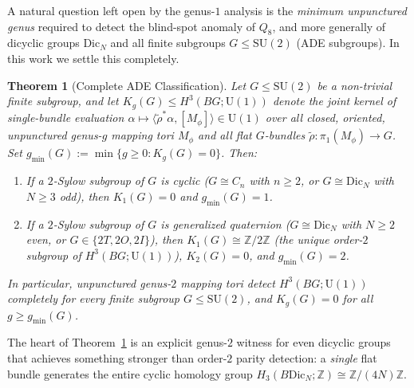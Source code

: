 \documentclass[11pt]{amsart}
\newtheorem{theorem}{Theorem}[section]
\theoremstyle{definition}
\theoremstyle{remark}
\newcommand{\Z}{\mathbb{Z}}
\newcommand{\U}{\mathrm{U}}
\newcommand{\SU}{\mathrm{SU}}
\newcommand{\Dic}{\mathrm{Dic}}
\begin{document}
A natural question left open by the genus-$1$ analysis is the \emph{minimum unpunctured genus} required to detect the blind-spot anomaly of $Q_8$, and more generally of dicyclic groups $\Dic_N$ and all finite subgroups $G \le \SU(2)$ (ADE subgroups).
In this work we settle this completely.

\begin{theorem}[Complete ADE Classification]\label{thm:ADE}
Let $G \le \SU(2)$ be a non-trivial finite subgroup, and let $K_g(G) \le H^3(BG;\U(1))$ denote the joint kernel of single-bundle evaluation $\alpha \mapsto \langle \tilde{\rho}^*\alpha, [M_\phi]\rangle \in \U(1)$ over all closed, oriented, unpunctured genus-$g$ mapping tori $M_\phi$ and all flat $G$-bundles $\tilde{\rho}\colon \pi_1(M_\phi)\to G$. Set $g_{\min}(G) := \min\{g \ge 0 : K_g(G) = 0\}$. Then:
\begin{enumerate}
    \item If a $2$-Sylow subgroup of $G$ is cyclic ($G \cong C_n$ with $n \ge 2$, or $G \cong \Dic_N$ with $N \ge 3$ odd), then $K_1(G)=0$ and $g_{\min}(G)=1$.
    \item If a $2$-Sylow subgroup of $G$ is generalized quaternion ($G \cong \Dic_N$ with $N \ge 2$ even, or $G \in \{2T, 2O, 2I\}$), then $K_1(G) \cong \Z/2\Z$ (the unique order-$2$ subgroup of $H^3(BG;\U(1))$), $K_2(G)=0$, and $g_{\min}(G)=2$.
\end{enumerate}
In particular, unpunctured genus-$2$ mapping tori detect $H^3(BG;\U(1))$ completely for every finite subgroup $G \le \SU(2)$, and $K_g(G)=0$ for all $g \ge g_{\min}(G)$.
\end{theorem}

The heart of Theorem~\ref{thm:ADE} is an explicit genus-$2$ witness for even dicyclic groups that achieves something stronger than order-$2$ parity detection: a \emph{single} flat bundle generates the entire cyclic homology group $H_3(B\Dic_N;\Z) \cong \Z/(4N)\Z$.
\end{document}
